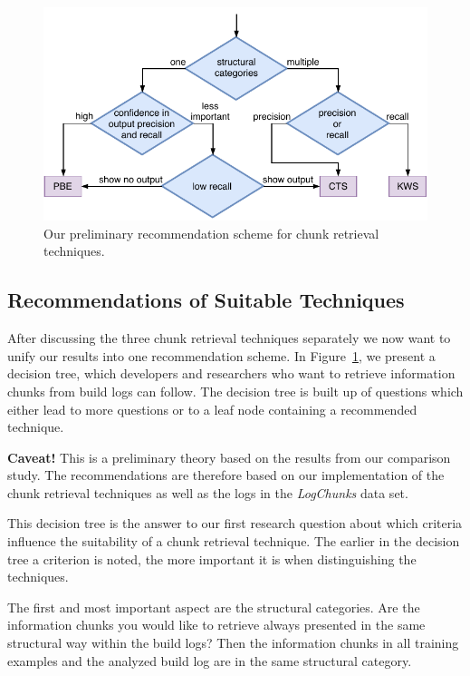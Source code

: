 \begin{figure}[!t]
		\centering
		\includegraphics[width=\columnwidth, clip]{img/crt-recommendation.pdf}
		\caption{Our preliminary recommendation scheme for chunk retrieval techniques.}
		\label{fig:crt-recommendation}
\end{figure}

\subsection{Recommendations of Suitable Techniques}
After discussing the three chunk retrieval techniques separately we now want to unify our results into one recommendation scheme.
In Figure~\ref{fig:crt-recommendation}, we present a decision tree, which developers and researchers who want to retrieve information chunks from build logs can follow.
The decision tree is built up of questions which either lead to more questions or to a leaf node containing a recommended technique. 

\noindent
\textbf{Caveat!} This is a preliminary theory based on the results from our comparison study.
The recommendations are therefore based on our implementation of the chunk retrieval techniques as well as the logs in the \emph{LogChunks} data set.

This decision tree is the answer to our first research question about which criteria influence the suitability of a chunk retrieval technique.
The earlier in the decision tree a criterion is noted, the more important it is when distinguishing the techniques.

The first and most important aspect are the structural categories.
Are the information chunks you would like to retrieve always presented in the same structural way within the build logs?
Then the information chunks in all training examples and the analyzed build log are in the same structural category.


